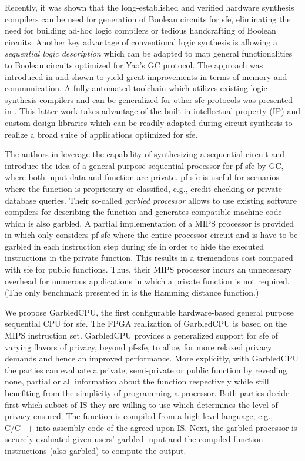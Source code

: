 Recently, it was shown that the long-established and verified hardware synthesis compilers can be used for generation of Boolean circuits for \acrshort{sfe}, eliminating the need for building ad-hoc logic compilers or tedious handcrafting of Boolean circuits. Another key advantage of conventional logic synthesis is allowing a \emph{sequential logic description} which can be adapted to map general functionalities to Boolean circuits optimized for Yao's GC protocol. The approach was introduced in \cite{songhori2015tinygarble} and shown to yield great improvements in terms of memory and communication. A fully-automated toolchain which utilizes existing logic synthesis compilers and can be generalized for other \acrshort{sfe} protocols was presented in \cite{demmler2015automated}. This latter work takes advantage of the built-in intellectual property (IP) and custom design libraries which can be readily adapted during circuit synthesis to realize a broad suite of applications optimized for \acrshort{sfe}.

The authors in \cite{songhori2015tinygarble} leverage the capability of synthesizing a sequential circuit and introduce the idea of a general-purpose sequential processor for \acrfull{pf-sfe} by GC, where both input data and function are private. \acrshort{pf-sfe} is useful for scenarios where the function is proprietary or classified, e.g., credit checking or private database queries. Their so-called \emph{garbled processor} allows to use existing software compilers for describing the function and generates compatible machine code which is also garbled. A partial implementation of a MIPS processor is provided in \cite{songhori2015tinygarble} which only considers \acrshort{pf-sfe} where the entire processor circuit and \acrfull{is} have to be garbled in each instruction step during \acrshort{sfe} in order to hide the executed instructions in the private function. This results in a tremendous cost compared with \acrshort{sfe} for public functions. Thus, their MIPS processor incurs an unnecessary overhead for numerous applications in which a private function is not required. (The only benchmark presented in \cite{songhori2015tinygarble} is the Hamming distance function.)

We propose GarbledCPU, the first configurable hardware-based general purpose sequential CPU for \acrshort{sfe}. The FPGA realization of GarbledCPU is based on the MIPS instruction set. GarbledCPU provides a generalized support for \acrshort{sfe} of varying flavors of privacy, beyond \acrshort{pf-sfe}, to allow for more relaxed privacy demands and hence an improved performance. More explicitly, with GarbledCPU the parties can evaluate a private, semi-private or public function by revealing none, partial or all information about the function respectively while still benefiting from the simplicity of programming a processor.
Both parties decide first which subset of IS they are willing to use which determines the level of privacy ensured. The function is compiled from a high-level language, e.g., C/C++ into assembly code of the agreed upon IS. Next, the garbled processor is securely evaluated given users' garbled input and the compiled function instructions (also garbled) to compute the output.

